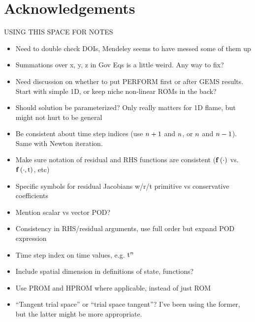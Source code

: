 \chapter{Acknowledgements}

{\color{red}
USING THIS SPACE FOR NOTES
\begin{itemize}
	\item Need to double check DOIs, Mendeley seems to have messed some of them up
	\item Summations over x, y, z in Gov Eqs is a little weird. Any way to fix?
	\item Need discussion on whether to put PERFORM first or after GEMS results. Start with simple 1D, or keep niche non-linear ROMs in the back?
	\item Should solution be parameterized? Only really matters for 1D flame, but might not hurt to be general
	\item Be consistent about time step indices (use $n + 1$ and $n$, or $n$ and $n - 1$). Same with Newton iteration.
	\item Make sure notation of residual and RHS functions are consistent ($\mathbf{f} \left(\cdot\right)$ vs. $\mathbf{f} \left(\cdot, \text{t}\right)$, etc)
	\item Specific symbols for residual Jacobians w/r/t primitive vs conservative coefficients
	\item Mention scalar vs vector POD?
	\item Consistency in RHS/residual arguments, use full order but expand POD expression
	\item Time step index on time values, e.g. $\text{t}^{n}$
	\item Include spatial dimension in definitions of state, functions?
	\item Use PROM and HPROM where applicable, instead of just ROM
	\item ``Tangent trial space'' or ``trial space tangent''? I've been using the former, but the latter might be more appropriate.
\end{itemize}

}